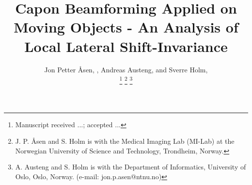 \documentclass[journal]{IEEEtran}
\begin{document}
%
\title{Capon Beamforming Applied on Moving Objects - An Analysis of Local Lateral Shift-Invariance}
%
%
%

\author{
   Jon Petter \AA{}sen, , Andreas Austeng,  and Sverre Holm, %
   
\thanks{Manuscript received ...; accepted ...}
\thanks{J. P. \AA{}sen and S. Holm is with the Medical Imaging Lab (MI-Lab) at the Norwegian University of Science and Technology, Trondheim, Norway.}
\thanks{A. Austeng and S. Holm is with the Department of Informatics, University of Oslo, Oslo, Norway. (e-mail: jon.p.asen@ntnu.no)} 
}

% 
%
\end{document}
